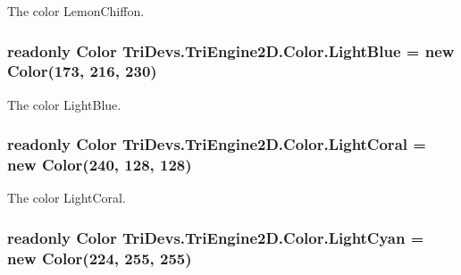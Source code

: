 The color Lemon\-Chiffon. 

\hypertarget{struct_tri_devs_1_1_tri_engine2_d_1_1_color_a26b55d84e33cf11eec00825edfd0dc71}{
\subsubsection[{Light\-Blue}]{\setlength{\rightskip}{0pt plus 5cm}readonly {\bf Color} Tri\-Devs.\-Tri\-Engine2\-D.\-Color.\-Light\-Blue = new {\bf Color}(173, 216, 230)\hspace{0.3cm}{\ttfamily [static]}}}\label{struct_tri_devs_1_1_tri_engine2_d_1_1_color_a26b55d84e33cf11eec00825edfd0dc71}


The color Light\-Blue. 

\hypertarget{struct_tri_devs_1_1_tri_engine2_d_1_1_color_af88ac202a4d5daf36ce4d5d88537cba6}{
\subsubsection[{Light\-Coral}]{\setlength{\rightskip}{0pt plus 5cm}readonly {\bf Color} Tri\-Devs.\-Tri\-Engine2\-D.\-Color.\-Light\-Coral = new {\bf Color}(240, 128, 128)\hspace{0.3cm}{\ttfamily [static]}}}\label{struct_tri_devs_1_1_tri_engine2_d_1_1_color_af88ac202a4d5daf36ce4d5d88537cba6}


The color Light\-Coral. 

\hypertarget{struct_tri_devs_1_1_tri_engine2_d_1_1_color_a764ff644d5a09f1fd9a3ac657c7f3d12}{
\subsubsection[{Light\-Cyan}]{\setlength{\rightskip}{0pt plus 5cm}readonly {\bf Color} Tri\-Devs.\-Tri\-Engine2\-D.\-Color.\-Light\-Cyan = new {\bf Color}(224, 255, 255)\hspace{0.3cm}{\ttfamily [static]}}}\label{struct_tri_devs_1_1_tri_engine2_d_1_1_color_a764ff644d5a09f1fd9a3ac657c7f3d12}


